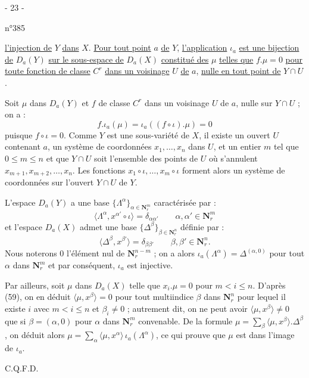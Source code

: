 \begin{center}- 23 -\end{center}
\begin{flushright}n°385\end{flushright}

\uline{l'injection de} $Y$ \uline{dans} $X$. \uline{Pour tout point} $a$ \uline{de} $Y$, \uline{l'application} $\iota_a$ \uline{est une bijection de} $D_a(Y)$ \uline{sur le sous-espace de} $D_a(X)$ \uline{constitué des} $\mu$ \uline{telles que} $f.\mu=0$ \uline{pour toute fonction de classe} $C^r$ \uline{dans un voisinage} $U$ \uline{de} $a$, \uline{nulle en tout point de} $Y\cap U$.

Soit $\mu$ dans $D_a(Y)$ et $f$ de classe $C^r$ dans un voisinage $U$ de $a$, nulle sur $Y\cap U$ ; on a :
\[
f.\iota_a(\mu)=\iota_a((f\circ\iota).\mu)=0
\]
puisque $f\circ\iota=0$. Comme $Y$ est une sous-variété de $X$, il existe un ouvert $U$ contenant $a$, un système de coordonnées $x_1,\ldots,x_n$ dans $U$, et un entier $m$ tel que $0\leq m\leq n$ et que $Y\cap U$ soit l'ensemble des points de $U$ où s'annulent $x_{m+1},x_{m+2},\ldots,x_n$. Les fonctions $x_1\circ\iota,\ldots,x_m\circ\iota$ forment alors un système de coordonnées sur l'ouvert $Y\cap U$ de $Y$.

L'espace $D_a(Y)$ a une base $\{\Lambda^\alpha\}_{\alpha\in\mathbf{N}_r^m}$ caractérisée par :
\[
\langle\Lambda^\alpha,x^{\alpha'}\circ\iota\rangle=\delta_{\alpha\alpha'}
\qquad \alpha,\alpha'\in\mathbf{N}_r^m
\]
et l'espace $D_a(X)$ admet une base $\{\Delta^\beta\}_{\beta\in\mathbf{N}_r^n}$ définie par :
\[
\langle\Delta^\beta,x^{\beta'}\rangle=\delta_{\beta\beta'}
\qquad \beta,\beta'\in\mathbf{N}_r^n.
\]
Nous noterons $0$ l'élément nul de $\mathbf{N}_r^{n-m}$ ; on a alors $\iota_a(\Lambda^\alpha)=\Delta^{(\alpha,0)}$ pour tout $\alpha$ dans $\mathbf{N}_r^m$ et par conséquent, $\iota_a$ est injective.

Par ailleurs, soit $\mu$ dans $D_a(X)$ telle que $x_i.\mu=0$ pour $m<i\leq n$. D'après (59), on en déduit $\langle\mu,x^\beta\rangle=0$ pour tout multiindice $\beta$ dans $\mathbf{N}_r^n$ pour lequel il existe $i$ avec $m<i\leq n$ et $\beta_i\neq0$ ; autrement dit, on ne peut avoir $\langle\mu,x^\beta\rangle\neq0$ que si $\beta=(\alpha,0)$ pour $\alpha$ dans $\mathbf{N}_r^m$ convenable. De la formule $\mu=\sum_\beta\langle\mu,x^\beta\rangle.\Delta^\beta$, on déduit alors $\mu=\sum_\alpha\langle\mu,x^\alpha\rangle\,\iota_a(\Lambda^\alpha)$, ce qui prouve que $\mu$ est dans l'image de $\iota_a$.
\begin{flushright}C.Q.F.D.\end{flushright}

